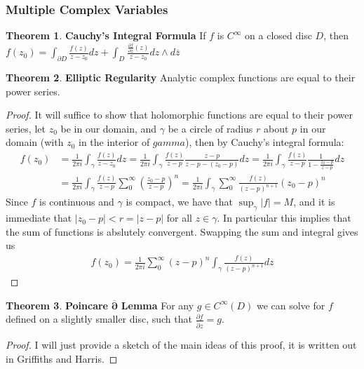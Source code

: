 \documentclass[11pt]{article}
\theoremstyle{definition}
\newtheorem{thm}{Theorem}
\newcommand{\abs}[1]{\lvert#1\rvert}
\begin{document}
    \subsubsection{Multiple Complex Variables}
    \begin{thm}
        \textbf{Cauchy's Integral Formula} If \(f\) is \(C^\infty\) on a closed disc \(D\), then \(f(z_0) = \int_{\partial D} \frac{f(z)}{z - z_0} dz + \int_D \frac{\frac{\partial f}{\partial \overline{z}}(z)}{z - z_0} dz \wedge d\overline{z} \)
    \end{thm}
    \begin{thm}
        \textbf{Elliptic Regularity} Analytic complex functions are equal to their power series.
        \begin{proof}
            It will suffice to show that holomorphic functions are equal to their power series, let \(z_0\) be in our domain, and \(\gamma\) be a circle of radius \(r\) about \(p\) in our domain (with \(z_0\) in the interior of \(gamma\)), then by Cauchy's integral formula:
            \begin{align*}
                f(z_0) &= \frac{1}{2\pi i}\int_{\gamma} \frac{f(z)}{z-z_0}dz = \frac{1}{2\pi i}\int_{\gamma} \frac{f(z)}{z-p} \frac{z-p}{z-p - (z_0 - p)}dz = \frac{1}{2\pi i}\int_{\gamma} \frac{f(z)}{z-p} \frac{1}{1 - \frac{z_0-p}{z-p}}dz \\
                &= \frac{1}{2\pi i}\int_{\gamma} \frac{f(z)}{z-p} \sum_0^\infty \left(\frac{z_0-p}{z-p}\right)^n = \frac{1}{2\pi i}\int_{\gamma}\sum_0^\infty \frac{f(z)}{(z-p)^{n+1}}(z_0-p)^n
            \end{align*}
            Since \(f\) is continuous and \(\gamma\) is compact, we have that \(\sup_\gamma\abs{f} = M\), and it is immediate that \(\abs{z_0 - p} < r = \abs{z - p}\) for all \(z \in \gamma\). In particular this implies that the sum of functions is abslutely convergent. Swapping the sum and integral gives us
            \begin{align*}
                f(z_0) = \frac{1}{2\pi i} \sum_0^\infty (z - p)^n \int_\gamma \frac{f(z)}{(z - p)^{n+1}}dz
            \end{align*}
        \end{proof}
    \end{thm}
    \begin{thm}
        \textbf{Poincare} \(\mathbf{\overline{\partial}}\) \textbf{Lemma} For any \(g \in C^\infty(D)\) we can solve for \(f\) defined on a slightly smaller disc, such that \(\frac{\partial f}{\overline{\partial} z} = g\).
        \begin{proof}
            I will just provide a sketch of the main ideas of this proof, it is written out in Griffiths and Harris.
        \end{proof}
    \end{thm}
\end{document}

